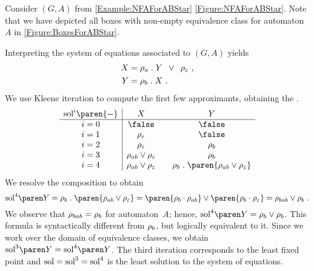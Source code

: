 \documentclass[../../diss.tex]{subfiles}
\begin{document}
\begin{example}%
\label{Example:CFGamesTwo}%
    Consider $(G,A)$ from \cref{Example:NFAForABStar} \resp \cref{Figure:NFAForABStar}.
    Note that we have depicted all boxes with non-empty equivalence class for automaton $A$ in \cref{Figure:BoxesForABStar}.

    Interpreting the system of equations associated to $(G,A)$ yields
    \begin{align*}
        X &= \tbox{a} \comp Y \enspace \vee \enspace \tbox{\eps}
        \ ,
        \\
        Y &= \tbox{b} \comp X
        \ .
    \end{align*}
    We use Kleene iteration to compute the first few approximants, obtaining the .
    \[
        \begin{array}{c|c@{\hskip 2em}c}
            \soli{i}\paren{-} & X & Y
            \\
            \hline
            i = 0 & \false & \false
            \\
            i = 1 & \tbox{\eps} & \false
            \\
            i = 2 & \tbox{\eps} & \tbox{b}
            \\
            i = 3 & \tbox{ab} \vee \tbox{\eps} & \tbox{b}
            \\
            i = 4 & \tbox{ab} \vee \tbox{\eps} & \tbox{b} \comp \paren{ \tbox{ab} \vee \tbox{\eps} }
        \end{array}
    \]
%
    We resolve the composition to obtain
    \[
        \sol{4}{Y}
        = \tbox{b} \comp \paren{ \tbox{ab} \vee \tbox{\eps} }
        = \paren{ \tbox{b} \cdot \tbox{ab} } \vee \paren{ \tbox{b} \cdot \tbox{\eps} } = \tbox{bab} \vee \tbox{b}
        \ .
    \]
    We observe that $\tbox{bab} = \tbox{b}$ for automaton~$A$; hence, $\sol{4}{Y} = \tbox{b} \vee \tbox{b}$.
    This formula is syntactically different from $\tbox{b}$, but logically equivalent to it.
    Since we work over the domain of equivalence classes, we obtain $\sol{3}{Y} = \sol{4}{Y}$.
    The third iteration corresponds to the least fixed point and $\sol = \soli{3} = \soli{4}$ is the least solution to the system of equations.
\end{example}
\end{document}
